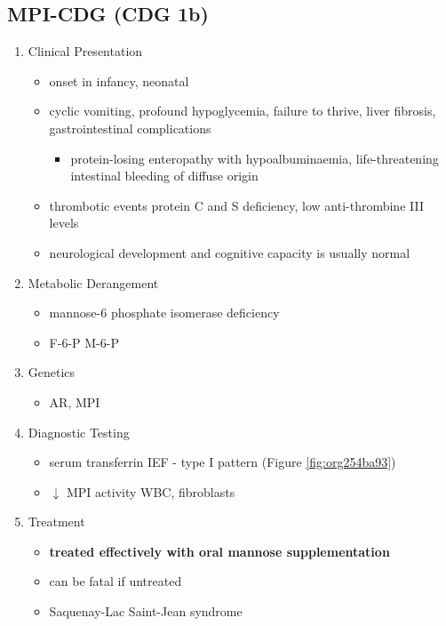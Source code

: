 \documentclass{scrartcl}
\begin{document}
\subsection{MPI-CDG (CDG 1b)}
\label{sec:org3a3cfa2}
\begin{enumerate}
\item Clinical Presentation
\label{sec:orga78007d}
\begin{itemize}
\item onset in infancy, neonatal
\item cyclic vomiting, profound hypoglycemia, failure to thrive, liver
fibrosis, gastrointestinal complications
\begin{itemize}
\item protein-losing enteropathy with hypoalbuminaemia, life-threatening
intestinal bleeding of diffuse origin
\end{itemize}
\item thrombotic events protein C and S deficiency, low anti-thrombine III levels
\item neurological development and cognitive capacity is usually normal
\end{itemize}

\item Metabolic Derangement
\label{sec:orgd0b9cca}
\begin{itemize}
\item mannose-6 phosphate isomerase deficiency
\item F-6-P \ce{<=>} M-6-P
\end{itemize}

\item Genetics
\label{sec:org428aaed}
\begin{itemize}
\item AR, MPI
\end{itemize}

\item Diagnostic Testing
\label{sec:org914ca73}
\begin{itemize}
\item serum transferrin IEF - type I pattern (Figure \ref{fig:org254ba93})
\item \(\downarrow\) MPI activity WBC, fibroblasts
\end{itemize}

\item Treatment
\label{sec:orgda87c1a}
\begin{itemize}
\item \textbf{treated effectively with oral mannose supplementation}
\item can be fatal if untreated
\item Saquenay-Lac Saint-Jean syndrome
\end{itemize}
\end{enumerate}
\end{document}
